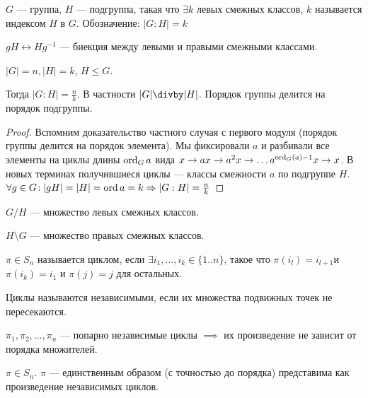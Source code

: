 \begin{definition}
    $G$ --- группа,  $H$ --- подгруппа, такая что  $\exists k$ левых смежных классов,  $k$ называется индексом  $H$ в  $G$. Обозначение: $|G : H| = k$
\end{definition}
\begin{exerc}
    $gH \longleftrightarrow Hg^{-1}$ --- биекция между левыми и правыми смежными классами.
\end{exerc}
\begin{theorem}
    $|G| = n, |H| = k$,  $H \le G$.

    Тогда $|G:H| = \frac{n}{k}$. В частности $|G| \divby |H|$. Порядок группы делится на порядок подгруппы.
\end{theorem}
\begin{proof}
    Вспомним доказательство частного случая с первого модуля (порядок группы делится на порядок элемента). Мы фиксировали $a$ и разбивали все элементы на циклы длины $\operatorname{ord}_G a$ вида $x \to ax \to a^2x \to \ldots a^{\operatorname{ord}_G(a) - 1}x \to x$. В новых терминах получившиеся циклы --- классы смежности $a$ по подгруппе $H$. $\forall g \in G\!: |gH| = |H| = \operatorname{ord} a = k \Rightarrow |G : H| = \frac{n}{k}$
\end{proof}
\begin{definition}
    $G / H$ --- множество левых смежных классов.

    $H \setminus G$ --- множество правых смежных классов.
\end{definition}
\begin{definition}
    $\pi \in S_n$ называется циклом, если  $\exists i_1, \ldots, i_k \in \{1..n\}$, такое что $\pi(i_l) = i_{l+1}$и  $\pi(i_k) = i_1$ и  $\pi(j) = j$ для остальных.
\end{definition}
\begin{definition}
    Циклы называются независимыми, если их множества подвижных точек не пересекаются.
\end{definition}
\begin{remark}
    $\pi_1, \pi_2, \ldots, \pi_n$ --- попарно независимые циклы $\implies$ их произведение не зависит от порядка множителей.
\end{remark}
\begin{theorem}
    $\pi \in S_n$.  $\pi$ --- единственным образом (с точностью до порядка) представима как произведение независимых циклов.
\end{theorem}
